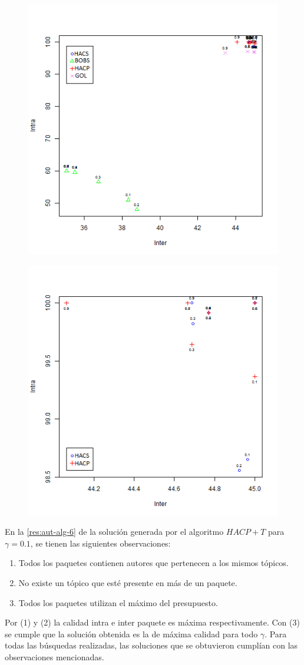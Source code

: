 \begin{figure}[H]
	\centering
	\includegraphics[width=0.60\linewidth]{img/aut-alg1-alg2-alg5-alg7.png}
	\caption{}
	\label{res:aut_alg1_vs_alg2_vs_alg5_vs_alg7}
\end{figure}

\begin{figure}[H]
	\centering
	\includegraphics[width=0.60\linewidth]{img/aut-alg1-alg5.png}
	\caption{}
	\label{res:aut_alg1_vs_alg5}
\end{figure}


En la \autoref{res:aut-alg-6} de la solución generada por el algoritmo $HACP+T$ para $\gamma = 0.1$, se tienen las siguientes observaciones:
\begin{enumerate}
	\item Todos los paquetes contienen autores que pertenecen a los mismos tópicos. 
	\item No existe un tópico que esté presente en más de un paquete.
	\item Todos los paquetes utilizan el máximo del presupuesto.
\end{enumerate}
Por (1) y (2) la calidad intra e inter paquete es máxima respectivamente. Con (3) se cumple que la solución obtenida es la de máxima calidad para todo $\gamma$. Para todas las búsquedas realizadas, las soluciones que se obtuvieron cumplían con las observaciones mencionadas.

